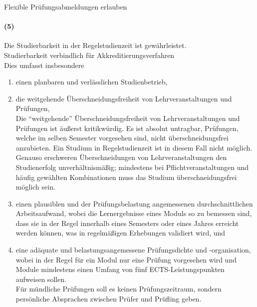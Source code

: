 \documentclass[a4paper]{scrartcl}
\begin{document}
\textcolor{Bernd}{\textbf{\cite{RESO: WiSe2018-PAA}} Flexible Prüfungsabmeldungen erlauben}\\

\vspace{4em}

\paragraph{(5)} Die Studierbarkeit in der Regelstudienzeit ist gewährleistet. \\

\textcolor{Bernd}{\textbf{\cite{RESO: SoSe2002-RL}} Studierbarkeit verbindlich für Akkreditierungsverfahren}\\

Dies umfasst insbesondere
\begin{enumerate}
\item einen planbaren und verlässlichen Studienbetrieb,
\item die weitgehende Überschneidungsfreiheit von Lehrveranstaltungen und Prüfungen,\\

\textcolor{Bruno}{\textbf{\cite{POS: WiSe2018-RL}} Die \enquote{weitgehende} Überschneidungsfreiheit von Lehrveranstaltungen und Prüfungen ist äußerst kritikwürdig. Es ist absolut untragbar, Prüfungen, welche im selben Semester vorgesehen sind, nicht überschneidungsfrei anzubieten. Ein Studium in Regelstudienzeit ist in diesem Fall nicht möglich. Genauso erschweren Überschneidungen von Lehrveranstaltungen den Studienerfolg unverhältnismäßig; mindestens bei Pflichtveranstaltungen und häufig gewählten Kombinationen muss das Studium überschneidungsfrei möglich sein.}


\item einen plausiblen und der Prüfungsbelastung angemessenen
durchschnittlichen Arbeitsaufwand, wobei die Lernergebnisse eines
Moduls so zu bemessen sind, dass sie in der Regel innerhalb eines
Semesters oder eines Jahres erreicht werden können, was in
regelmäßigen Erhebungen validiert wird, und
\item eine adäquate und belastungsangemessene Prüfungsdichte und -organisation, wobei in der Regel für ein Modul nur eine Prüfung
vorgesehen wird und Module mindestens einen Umfang von fünf ECTS-Leistungspunkten aufweisen sollen.\\

\textcolor{Bernd}{\textbf{\cite{PROT: WiSe2015-RL}} Für mündliche Prüfungen soll es keinen Prüfungszeitraum, sondern persönliche Absprachen zwischen Prüfer und Prüfling geben.}\\


\end{enumerate}
\end{document}
